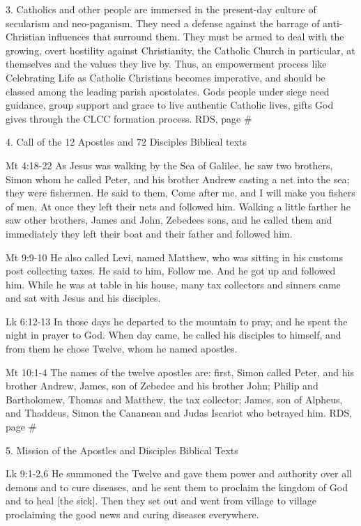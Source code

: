 \documentclass[oneside]{book}
\begin{document}
3. Catholics and other people are immersed in the present-day culture of
secularism and neo-paganism. They need a defense against the barrage of
anti-Christian influences that surround them. They must be armed to deal with
the growing, overt hostility against Christianity, the Catholic Church in
particular, at themselves and the values they live by. Thus, an empowerment
process like Celebrating Life as Catholic Christians becomes imperative, and
should be classed among the leading parish apostolates. Gods people under siege
need guidance, group support and grace to live authentic Catholic lives, gifts
God gives through the CLCC formation process.  RDS, page \#

4. Call of the 12 Apostles and 72 Disciples Biblical texts

Mt 4:18-22 As Jesus was walking by the Sea of Galilee, he saw two brothers,
Simon whom he called Peter, and his brother Andrew casting a net into the sea;
they were fishermen. He said to them, Come after me, and I will make you fishers
of men. At once they left their nets and followed him. Walking a little farther
he saw other brothers, James and John, Zebedees sons, and he called them and
immediately they left their boat and their father and followed him.

Mt 9:9-10 He also called Levi, named Matthew, who was sitting in his customs
post collecting taxes. He said to him, Follow me. And he got up and followed
him. While he was at table in his house, many tax collectors and sinners came
and sat with Jesus and his disciples.

Lk 6:12-13 In those days he departed to the mountain to pray, and he spent the
night in prayer to God. When day came, he called his disciples to himself, and
from them he chose Twelve, whom he named apostles.

Mt 10:1-4 The names of the twelve apostles are: first, Simon called Peter, and
his brother Andrew, James, son of Zebedee and his brother John; Philip and
Bartholomew, Thomas and Matthew, the tax collector; James, son of Alpheus, and
Thaddeus, Simon the Cananean and Judas Iscariot who betrayed him.  RDS, page \#

5. Mission of the Apostles and Disciples Biblical Texts

Lk 9:1-2,6 He summoned the Twelve and gave them power and authority over all
demons and to cure diseases, and he sent them to proclaim the kingdom of God and
to heal [the sick]. Then they set out and went from village to village
proclaiming the good news and curing diseases everywhere.
\end{document}
